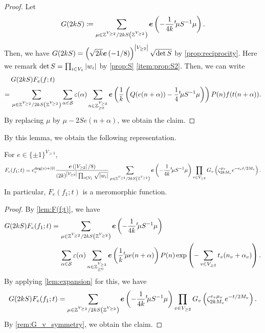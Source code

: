 \documentclass[11pt,a4paper,lualatex]{amsart}
\numberwithin{equation}{section} %
\begin{document}
\begin{proof}
	Let
	\[
	G(2kS) \coloneqq
	\sum_{ \mu \in \Z^{V_{\ge 2}} / 2kS \left(\Z^{V_{\ge 2}} \right) } 
	\bm{e} \left( -\frac{1}{4k} {}^t\!\mu S^{-1} \mu \right).
	\]
	Then, we have $ G(2kS) = \left( \sqrt{2k} \bm{e} \left( -1/8 \right) \right)^{\left\lvert V_{\ge 2}\right\rvert} \sqrt{\det S} $ by \cref{prop:reciprocity}. 
	Here we remark $ \det S = \prod_{i \in V_1} \left\lvert w_i\right\rvert $ by \cref{prop:S} \cref{item:prop:S2}.
	Then, we can write
	\begin{align}
		&G(2kS) F_e(f; t)  \\
		= \,
		&\sum_{ \mu \in \mathbb{Z}^{V_{\ge 2}} / 2kS \left(\mathbb{Z}^{V_{\ge 2}} \right) } 
		\sum_{\alpha \in \mathcal{S}} \varepsilon(\alpha)
		\sum_{n \in \mathbb{Z}_{\ge 0}^{V_{\ge 3}}}
		\bm{e}\left( \frac{1}{k} \left( Q(e(n + \alpha)) - \frac{1}{4} {}^t\!\mu S^{-1} \mu \right) \right) P(n) f(t(n + \alpha)).
	\end{align}
	By replacing $ \mu $ by $ \mu - 2Se(n + \alpha) $, we obtain the claim.
\end{proof}

By this lemma, we obtain the following representation.

\begin{lem} \label{lem:F(f_1;t)}
	For $ e \in \{ \pm 1 \}^{V_{\ge 3}} $,
	\begin{align}
		F_e(f_1; t) = 
		e_v^{\deg (v) + \left\lvert\overline{v}\right\rvert}
		\frac{\bm{e} \left( \left\lvert V_{\ge 2}\right\rvert/8 \right)}{(2k)^{\left\lvert V_{\ge 2}\right\rvert} \prod_{i \in V_1} \sqrt{\left\lvert w_i\right\rvert}}
		\sum_{ \mu \in \mathbb{Z}^{V_{\ge 2}} / 2kS \left(\mathbb{Z}^{V_{\ge 2}} \right) } 
		\bm{e} \left( -\frac{1}{4k} {}^t\!\mu S^{-1} \mu \right) 
		\prod_{v \in V_{\ge 2}} G_v \left( \zeta_{2kM_v}^{\mu_v} e^{-e_v t/2M_v} \right).
	\end{align}
	In particular, $ F_e(f_1; t) $ is a meromorphic function.
\end{lem}

\begin{proof}
	By \cref{lem:F(f;t)}, we have
	\begin{align}
		G(2kS) F_e(f_1; t)
		= \,
		&\sum_{ \mu \in \mathbb{Z}^{V_{\ge 2}} / 2kS \left(\mathbb{Z}^{V_{\ge 2}} \right) } 
		\bm{e} \left( -\frac{1}{4k} {}^t\!\mu S^{-1} \mu \right) \\
		&\sum_{\alpha \in \mathcal{S}} \varepsilon(\alpha)
		\sum_{n \in \mathbb{Z}_{\ge 0}^{V_{\ge 3}}}
		\bm{e}\left( \frac{1}{k} {}^t\!\mu e(n + \alpha) \right) P(n) \exp \left( - \sum_{ v \in V_{\ge 3} } t_v (n_v + \alpha_{v}) \right).
	\end{align}
	By applying \cref{lem:expansion} for this, we have
	\[
	G(2kS) F_e(f_1; t)
	= 
	\sum_{ \mu \in \mathbb{Z}^{V_{\ge 2}} / 2kS \left(\mathbb{Z}^{V_{\ge 2}} \right) } 
	\bm{e} \left( -\frac{1}{4k} {}^t\!\mu S^{-1} \mu \right)
	\prod_{v \in V_{\ge 2}} G_v \left( \zeta_{2kM_v}^{e_v \mu_v} e^{-t/2M_v} \right).
	\]
	By \cref{rem:G_v_symmetry}, we obtain the claim. 
\end{proof}
\end{document}
